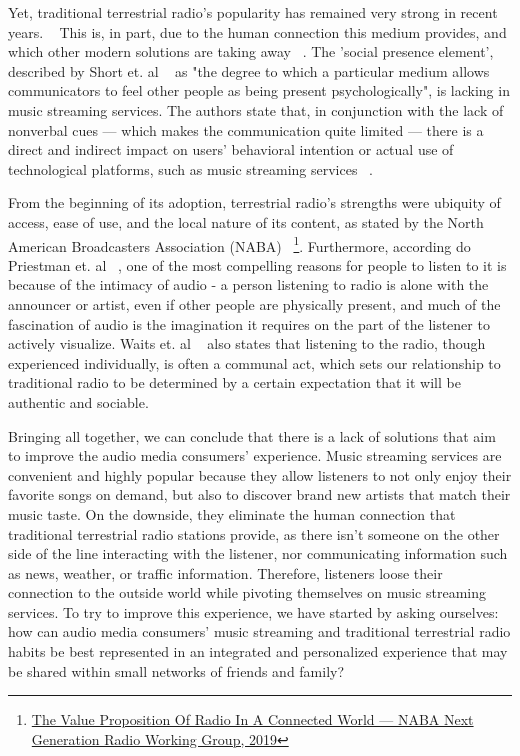 Yet, traditional terrestrial radio's popularity has remained very strong in recent years. ~\cite{Albarran2007} This is, in part, due to the human connection this medium provides, and which other modern solutions are taking away ~\cite{Waits2007}. The 'social presence element', described by Short et. al ~\cite{JohnShortEderynWilliams1976} as "the degree to which a particular medium allows communicators to feel other people as being present psychologically", is lacking in music streaming services. The authors state that, in conjunction with the lack of nonverbal cues —  which makes the communication quite limited — there is a direct and indirect impact on users’ behavioral intention or actual use of technological platforms, such as music streaming services ~\cite{Wang2014}.

From the beginning of its adoption, terrestrial radio's strengths were ubiquity of access, ease of use, and the local nature of its content, as stated by the North American Broadcasters Association (NABA) ~\footnote{\href{https://nabanet.com/wp-content/uploads/2019/03/NGR-WG-Value-Proposition-of-Radio-in-a-Connected-World-2019-03-15.pdf}{The Value Proposition Of Radio In A Connected World — NABA Next Generation Radio Working Group, 2019}}. Furthermore, according do Priestman et. al ~\cite{Priestman2005}, one of the most compelling reasons for people to listen to it is because of the intimacy of audio - a person listening to radio is alone with the announcer or artist, even if other people are physically present, and much of the fascination of audio is the imagination it requires on the part of the listener to actively visualize. Waits et. al ~\cite{Waits2007} also states that listening to the radio, though experienced individually, is often a communal act, which sets our relationship to traditional radio to be determined by a certain expectation that it will be authentic and sociable.

Bringing all together, we can conclude that there is a lack of solutions that aim to improve the audio media consumers' experience. Music streaming services are convenient and highly popular because they allow listeners to not only enjoy their favorite songs on demand, but also to discover brand new artists that match their music taste. On the downside, they eliminate the human connection that traditional terrestrial radio stations provide, as there isn't someone on the other side of the line interacting with the listener, nor communicating information such as news, weather, or traffic information. Therefore, listeners loose their connection to the outside world while pivoting themselves on music streaming services. To try to improve this experience, we have started by asking ourselves: how can audio media consumers' music streaming and traditional terrestrial radio habits be best represented in an integrated and personalized experience that may be shared within small networks of friends and family?


